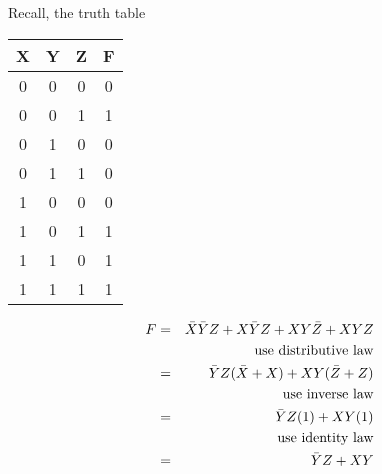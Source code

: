\begin{frame}[fragile]
Recall, the truth table

\begin{multicols}{2}
\begin{center}
     {\footnotesize	
 \begin{tabular}{ccc|c}
		X&Y&Z & F  \\\hline
		0&0&0 & 0  \\
		0&0&1 & 1  \\
		0&1&0 & 0  \\
		0&1&1 & 0  \\
		1&0&0 & 0  \\
		1&0&1 & 1  \\
		1&1&0 & 1 \\
		1&1&1 & 1  \\
		\end{tabular}
  }
  \end{center}	
  \columnbreak  
{\footnotesize
\begin{eqnarray*}
F &=& \Bar{X}\Bar{Y}Z + X\Bar{Y}Z + XY\Bar{Z} + XYZ \\
& & \text{use distributive law}\\
  &=& \Bar{Y}Z (\Bar{X}+X) + XY(\Bar{Z}+Z)\\
  & & \text{use inverse law}\\
   &=& \Bar{Y}Z (1) + XY(1)\\
    & & \text{use identity law}\\
  &=& \Bar{Y}Z + XY
\end{eqnarray*}
}
\end{multicols}

\end{frame}
